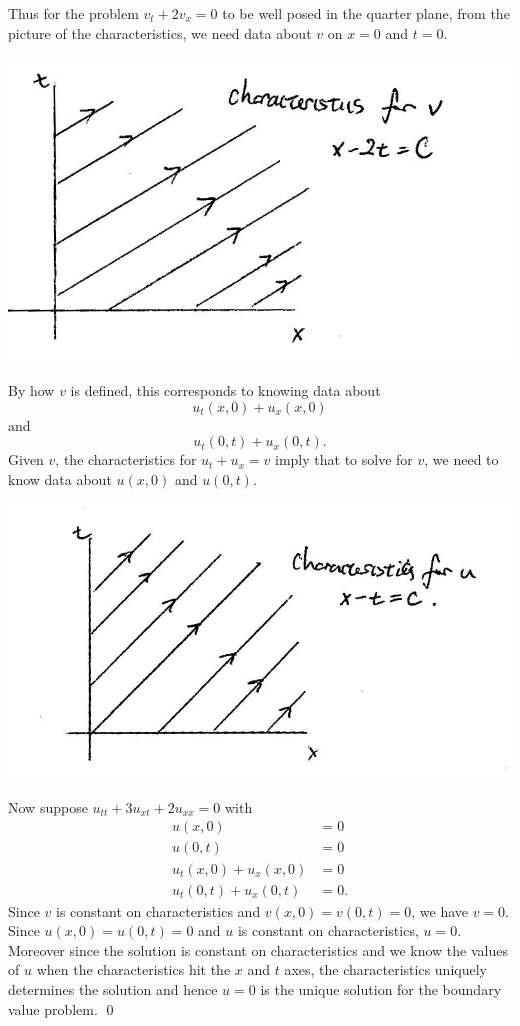 Thus for the problem $v_{t} + 2v_{x} = 0$ to be well posed in the quarter plane, from the picture of the characteristics, we need data about $v$ on $x = 0$
and $t = 0$.
\begin{center}
\includegraphics[scale = 0.5]{./_Figures/S098_1.png}
\end{center}
By how $v$ is defined, this corresponds to knowing data about $$u_{t}(x,0) + u_{x}(x, 0)$$ and $$u_{t}(0, t) + u_{x}(0,t).$$
Given $v$, the characteristics for $u_{t} + u_{x} = v$ imply that to solve for $v$, we need to know data about $u(x, 0)$ and $u(0, t)$.
\begin{center}
\includegraphics[scale=0.5]{./_Figures/S098_2.png}
\end{center}
Now suppose $u_{tt} + 3u_{xt} + 2u_{xx} = 0$ with
\begin{align*}
u(x,0) &= 0\\
u(0, t) &= 0\\
u_{t}(x, 0) + u_{x}(x, 0) &= 0\\
u_{t}(0, t) + u_{x}(0, t) &= 0.
\end{align*}
Since $v$ is constant on characteristics and $v(x, 0) = v(0, t) = 0$, we have $v = 0$. Since $u(x, 0) = u(0, t) = 0$ and $u$ is constant on characteristics,
$u = 0$. Moreover since the solution is constant on characteristics and we know the values of $u$ when the characteristics hit the $x$ and $t$ axes,
the characteristics uniquely determines the solution and hence $u = 0$ is the unique solution for the boundary value problem.
\hfill\qed

